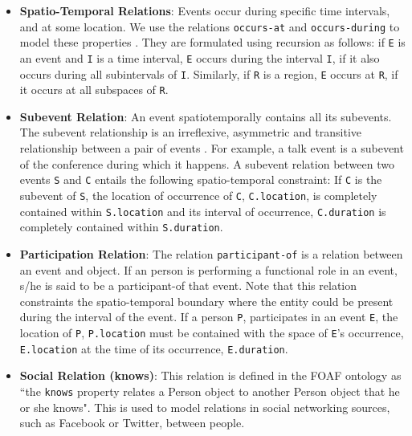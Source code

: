 \begin{itemize}
\item \textbf{Spatio-Temporal Relations}: Events occur during specific time intervals, and at some location. We use the relations \texttt{occurs-at} and \texttt{occurs-during} to model these properties \cite{gupta2011managing}. They are formulated using recursion as follows: if \texttt{E} is an event and \texttt{I} is a time interval, \texttt{E} occurs during the interval \texttt{I}, if it also occurs during all subintervals of \texttt{I}. Similarly, if \texttt{R} is a region, \texttt{E} occurs at \texttt{R}, if it occurs at all subspaces of \texttt{R}.

\item \textbf{Subevent Relation}: An event spatiotemporally contains all its subevents. The subevent relationship is an irreflexive, asymmetric and transitive relationship between a pair of events \cite{gupta2011managing}. For example, a talk event is a subevent of the conference during which it happens. A subevent relation between two events \texttt{S} and \texttt{C} entails the following spatio-temporal constraint: If \texttt{C} is the subevent of \texttt{S}, the location of occurrence of \texttt{C}, \texttt{C.location}, is completely contained within \texttt{S.location} and its interval of occurrence, \texttt{C.duration} is completely contained within \texttt{S.duration}.

\item \textbf{Participation Relation}: The relation \texttt{participant-of} is a relation between an event and object. If an person is performing a functional role in an event, s/he is said to be a participant-of that event. Note that this relation constraints the spatio-temporal boundary where the entity could be present during the interval of the event. If a person \texttt{P}, participates in an event \texttt{E}, the location of \texttt{P}, \texttt{P.location} must be contained with the space of \texttt{E}'s occurrence, \texttt{E.location} at the time of its occurrence, \texttt{E.duration}.

\item \textbf{Social Relation (knows)}: This relation is defined in the FOAF ontology \cite{brickley2010foaf} as ``the \texttt{knows} property relates a Person object to another Person object that he or she knows". This is used to model relations in social networking sources, such as Facebook or Twitter, between people.
\end{itemize}

